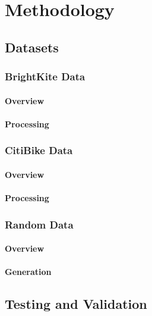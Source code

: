 \chapter{Methodology}

\section{Datasets}

\subsection{BrightKite Data}

\subsubsection{Overview}

\subsubsection{Processing}

\subsection{CitiBike Data}

\subsubsection{Overview}

\subsubsection{Processing}

\subsection{Random Data}

\subsubsection{Overview}

\subsubsection{Generation}

\section{Testing and Validation}

